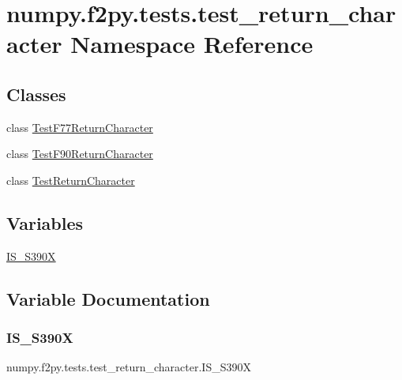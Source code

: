 \hypertarget{namespacenumpy_1_1f2py_1_1tests_1_1test__return__character}{}\section{numpy.\+f2py.\+tests.\+test\+\_\+return\+\_\+character Namespace Reference}
\label{namespacenumpy_1_1f2py_1_1tests_1_1test__return__character}
\subsection*{Classes}
\begin{DoxyCompactItemize}
\item 
class \hyperlink{classnumpy_1_1f2py_1_1tests_1_1test__return__character_1_1TestF77ReturnCharacter}{Test\+F77\+Return\+Character}
\item 
class \hyperlink{classnumpy_1_1f2py_1_1tests_1_1test__return__character_1_1TestF90ReturnCharacter}{Test\+F90\+Return\+Character}
\item 
class \hyperlink{classnumpy_1_1f2py_1_1tests_1_1test__return__character_1_1TestReturnCharacter}{Test\+Return\+Character}
\end{DoxyCompactItemize}
\subsection*{Variables}
\begin{DoxyCompactItemize}
\item 
\hyperlink{namespacenumpy_1_1f2py_1_1tests_1_1test__return__character_a6756ee3b1d3521a6cf5ba4b127db6a50}{I\+S\+\_\+\+S390X}
\end{DoxyCompactItemize}


\subsection{Variable Documentation}
\mbox{\label{namespacenumpy_1_1f2py_1_1tests_1_1test__return__character_a6756ee3b1d3521a6cf5ba4b127db6a50}} 
\subsubsection{\texorpdfstring{I\+S\+\_\+\+S390X}{IS\_S390X}}
{\footnotesize\ttfamily numpy.\+f2py.\+tests.\+test\+\_\+return\+\_\+character.\+I\+S\+\_\+\+S390X}


